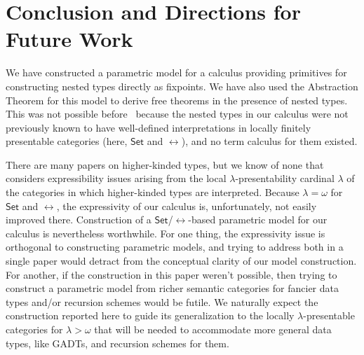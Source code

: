 \documentclass[runningheads]{llncs}
\newcommand{\set}{\mathsf{Set}}
\begin{document}
\section{Conclusion and Directions for Future Work}\label{sec:conclusion}

We have constructed a parametric model for a calculus
providing primitives for constructing nested types directly as
fixpoints.
We have also used the Abstraction Theorem for this model to derive
free theorems in the presence of nested types. This was not possible
before~\cite{jp19} because the nested types in our calculus were not
previously known to have well-defined interpretations in locally
finitely presentable categories (here, $\set$ and $\rel$), and no term
calculus for them existed.

There are many papers on higher-kinded types, but we know of none that
considers expressibility issues arising from the local
$\lambda$-presentability cardinal $\lambda$ of the categories in which
higher-kinded types are interpreted. Because $\lambda = \omega$ for
$\set$ and $\rel$, the expressivity of our
calculus is, unfortunately, not easily improved there. Construction of
a $\set$/$\rel$-based parametric model for our calculus is
nevertheless worthwhile.  For one thing, the expressivity issue is
orthogonal to constructing parametric models,
and trying to address both in a single paper would
detract from the conceptual clarity of our model construction.
%
For another, if the construction in this paper
weren't possible, then trying to construct a parametric model from
richer semantic categories for fancier data types and/or recursion
schemes would be futile. We naturally expect the construction reported
here to guide its generalization to the locally $\lambda$-presentable
categories for $\lambda > \omega$ that will be needed to accommodate
more general data types, like GADTs, and recursion schemes for them.
\end{document}
